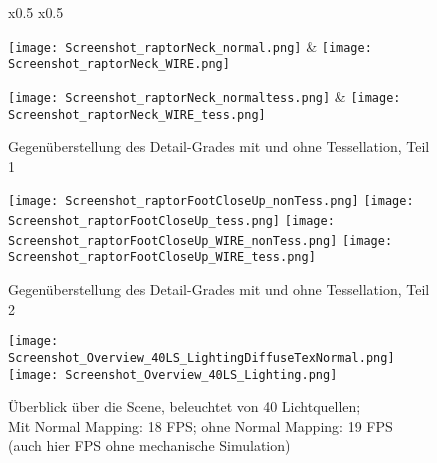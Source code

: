\begin{figure}[!h]	 	
	\begin{tabular}{ x{0.5\textwidth} x{0.5\textwidth} }

   		\tabularnewline	
   		
		\tabularnewline   		
		\tabularnewline
		
		\texttt{[image: Screenshot\_raptorNeck\_normal.png]} 
		&
		\texttt{[image: Screenshot\_raptorNeck\_WIRE.png]} 
		\tabularnewline
		
		\tabularnewline
		
		\texttt{[image: Screenshot\_raptorNeck\_normaltess.png]}
		&
		\texttt{[image: Screenshot\_raptorNeck\_WIRE\_tess.png]}
		\tabularnewline

	\end{tabular}
	\caption{Gegenüberstellung des Detail-Grades mit und ohne Tessellation, Teil 1}
	\label{fig:gegenueberstellungTessNonTessCloseUpRaptorNeck}
\end{figure}


\begin{figure}[!h]	 	
	\texttt{[image: Screenshot\_raptorFootCloseUp\_nonTess.png]} 
	\texttt{[image: Screenshot\_raptorFootCloseUp\_tess.png]} 
	\texttt{[image: Screenshot\_raptorFootCloseUp\_WIRE\_nonTess.png]} 
	\texttt{[image: Screenshot\_raptorFootCloseUp\_WIRE\_tess.png]} 

	\caption{Gegenüberstellung des Detail-Grades mit und ohne Tessellation, Teil 2}
	\label{fig:gegenueberstellungTessNonTessCloseUpRaptorFoot}
\end{figure}


\begin{figure}[!h]

	\texttt{[image: Screenshot\_Overview\_40LS\_LightingDiffuseTexNormal.png]} 
	\texttt{[image: Screenshot\_Overview\_40LS\_Lighting.png]}

	\caption{Überblick über die Scene, beleuchtet von 40 Lichtquellen; \\
	Mit Normal Mapping: 18 FPS; ohne Normal Mapping: 19 FPS\\
	(auch hier FPS ohne mechanische Simulation)
	}
	\label{fig:sceneOverview40LQ}
\end{figure}


